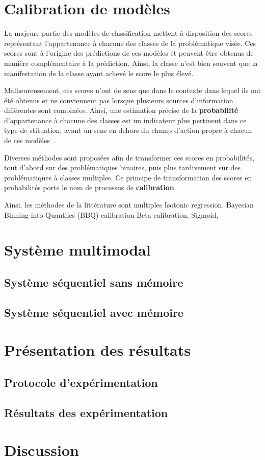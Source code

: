 \section{Calibration de modèles}
La majeure partie des modèles de classification mettent à disposition des scores représentant l'appartenance à chacune des classes de la problématique visée. Ces scores sont à l'origine des prédictions de ces modèles et peuvent être obtenus de manière complémentaire à la prédiction. Ainsi, la classe n'est bien souvent que la manifestation de la classe ayant achevé le score le plus élevé.\par

Malheureusement, ces scores n'ont de sens que dans le contexte dans lequel ils ont été obtenus et ne conviennent pas lorsque plusieurs sources d'information différentes sont combinées. Ainsi, une estimation précise de la \textbf{probabilité} d'appartenance à chacune des classes est un indicateur plus pertinent dans ce type de stituation, ayant un sens en dehors du champ d'action propre à chacun de ces modèles~\cite{Zadrozny2002}.\par

Diverses méthodes sont proposées afin de transformer ces scores en probabilités, tout d'abord sur des problématiques binaires, puis plus tardivement sur des problématiques à classes multiples. Ce principe de transformation des scores en probabilités porte le nom de processus de \textbf{calibration}.\par

Ainsi, les méthodes de la littérature sont multiples
Isotonic regression, \cite{Zadrozny2002}
Bayesian Binning into Quantiles (BBQ) calibration\cite{Naeini2015}
Beta calibration,\cite{Kull2017}
Sigmoid,\cite{kull2017b}

\section{Système multimodal}
\subsection{Système séquentiel sans mémoire}
\subsection{Système séquentiel avec mémoire}

\section{Présentation des résultats}
\subsection{Protocole d’expérimentation}
\subsection{Résultats des expérimentation}
\section{Discussion}